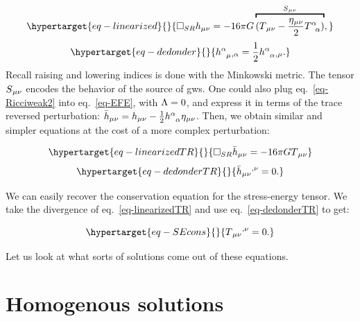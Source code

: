 \documentclass[
  10pt,
  a4paper,
  DIV=11,
  numbers=noendperiod,
  twoside]{scrreprt}
\DeclareRobustCommand{\[}{\begin{equation}}
\DeclareRobustCommand{\]}{\end{equation}}
\begin{document}
\begin{equation}\protect\hypertarget{eq-linearized}{}{
\square_{SR} \weakmet = -16\pi \grav \overbracket{(\SEco-\frac{\mink}{2}\trSE)}^{\srcco} ,
}\label{eq-linearized}\end{equation}
\begin{equation}\protect\hypertarget{eq-dedonder}{}{
\ipdv{\mixweakmet[\ind{\alpha}{\mu}]}{\alpha}=\frac{1}{2}\ipdv{\trweakmet}{\mu}. 
}\label{eq-dedonder}\end{equation} Recall raising and lowering indices
is done with the Minkowski metric. The tensor \(S{}_{\mu\nu}\) encodes the
behavior of the source of \glspl{gw}. One could also plug
eq.~\ref{eq-Ricciweak2} into eq.~\ref{eq-EFE}, with \(\Lambda=0\), and
express it in terms of the trace reversed perturbation:
\(\weakTRmet=\weakmet - \frac{1}{2}\trweakmet\mink\). Then, we obtain
similar and simpler equations at the cost of a more complex
perturbation: 

\begin{equation}\protect\hypertarget{eq-linearizedTR}{}{
\square_{SR} \weakTRmet = -16\pi \grav \SEco
}\label{eq-linearizedTR}\end{equation}
\begin{equation}\protect\hypertarget{eq-dedonderTR}{}{
    \ipdv[^]{\weakTRmet}{\nu}=0. 
}\label{eq-dedonderTR}\end{equation}

We can easily recover the conservation equation for the stress-energy
tensor. We take the divergence of eq.~\ref{eq-linearizedTR} and use
eq.~\ref{eq-dedonderTR} to get:

\begin{equation}\protect\hypertarget{eq-SEcons}{}{
    \ipdv[^]{\SEco}{\nu}=0.
}\label{eq-SEcons}\end{equation}

Let us look at what sorts of solutions come out of these equations.

\hypertarget{homogenous-solutions}{%
\section{Homogenous solutions}\label{homogenous-solutions}}
\end{document}
